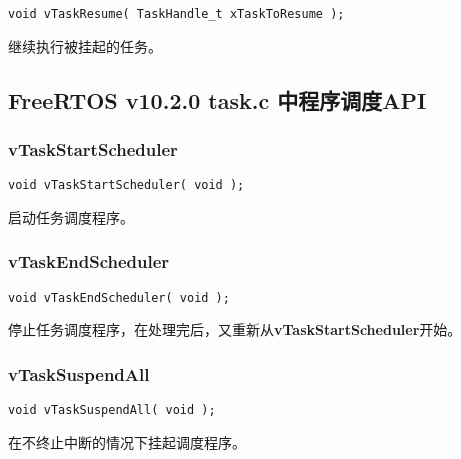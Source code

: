 \documentclass[12pt, a4paper]{article}
\begin{document}
\begin{lstlisting}[language={[ANSI]C},keywordstyle=\color{blue!70},commentstyle=\color{red!50!green!50!blue!50},frame=shadowbox, rulesepcolor=\color{red!20!green!20!blue!20}]
void vTaskResume( TaskHandle_t xTaskToResume );
\end{lstlisting}

继续执行被挂起的任务。

\subsection {FreeRTOS v10.2.0 task.c 中程序调度API}

\subsubsection {vTaskStartScheduler}

\begin{lstlisting}[language={[ANSI]C},keywordstyle=\color{blue!70},commentstyle=\color{red!50!green!50!blue!50},frame=shadowbox, rulesepcolor=\color{red!20!green!20!blue!20}]
void vTaskStartScheduler( void );
\end{lstlisting}

启动任务调度程序。

\subsubsection {vTaskEndScheduler}

\begin{lstlisting}[language={[ANSI]C},keywordstyle=\color{blue!70},commentstyle=\color{red!50!green!50!blue!50},frame=shadowbox, rulesepcolor=\color{red!20!green!20!blue!20}]
void vTaskEndScheduler( void );
\end{lstlisting}

停止任务调度程序，在处理完后，又重新从\textbf{vTaskStartScheduler}开始。

\subsubsection {vTaskSuspendAll}

\begin{lstlisting}[language={[ANSI]C},keywordstyle=\color{blue!70},commentstyle=\color{red!50!green!50!blue!50},frame=shadowbox, rulesepcolor=\color{red!20!green!20!blue!20}]
void vTaskSuspendAll( void );
\end{lstlisting}

在不终止中断的情况下挂起调度程序。
\end{document}
